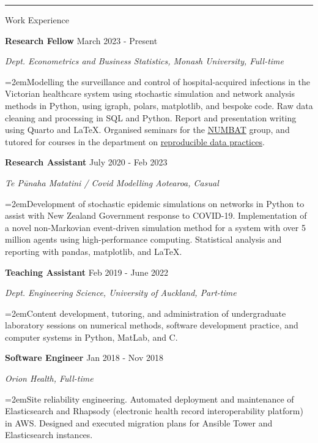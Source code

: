 \documentclass[paper=a4paper,fontsize=11pt]{scrartcl}
\newcommand{\pagerule}[1][2pt]{\noindent\rule{\textwidth}{#1}}
\newcommand{\usingfont}[2]{#1 #2 \par \normalsize \normalfont}
\newcommand{\sectionheader}[1]{\pagerule \vspace{0.05ex} \usingfont{\usefont{T1}{phv}{m}{v} \Large}{\noindent \hspace{-0.5em} #1} \vspace{0.5ex}}
\newcommand{\indented}[1][2em]{\noindent\hangindent=#1\hangafter=0}
\begin{document}
\sectionheader{Work Experience}
\noindent \textbf{Research Fellow} \hfill
{March 2023 - Present} \par
\noindent \textit{Dept. Econometrics and Business Statistics, Monash
University, Full-time} \par
\indented \small {Modelling the surveillance and control of
hospital-acquired infections in the Victorian healthcare system using
stochastic simulation and network analysis methods in Python, using
igraph, polars, matplotlib, and bespoke code. Raw data cleaning and
processing in SQL and Python. Report and presentation writing using
Quarto and \LaTeX. Organised seminars for the
\href{https://numbat.space}{NUMBAT} group, and tutored for courses in
the department on
\href{https://handbook.monash.edu/2024/units/ETC5513}{reproducible data
practices}.}
\normalsize \par\par
\noindent \textbf{Research Assistant} \hfill
{July 2020 - Feb 2023} \par
\noindent \textit{Te Pūnaha Matatini / Covid Modelling
Aotearoa, Casual} \par
\indented \small {Development of stochastic epidemic simulations on
networks in Python to assist with New Zealand Government response to
COVID-19. Implementation of a novel non-Markovian event-driven
simulation method for a system with over 5 million agents using
high-performance computing. Statistical analysis and reporting with
pandas, matplotlib, and \LaTeX.}
\normalsize \par\par
\noindent \textbf{Teaching Assistant} \hfill
{Feb 2019 - June 2022} \par
\noindent \textit{Dept. Engineering Science, University of
Auckland, Part-time} \par
\indented \small {Content development, tutoring, and administration of
undergraduate laboratory sessions on numerical methods, software
development practice, and computer systems in Python, MatLab, and C.}
\normalsize \par\par
\noindent \textbf{Software Engineer} \hfill
{Jan 2018 - Nov 2018} \par
\noindent \textit{Orion Health, Full-time} \par
\indented \small {Site reliability engineering. Automated deployment and
maintenance of Elasticsearch and Rhapsody (electronic health record
interoperability platform) in AWS. Designed and executed migration plans
for Ansible Tower and Elasticsearch instances.}
\normalsize \par\par
\end{document}
